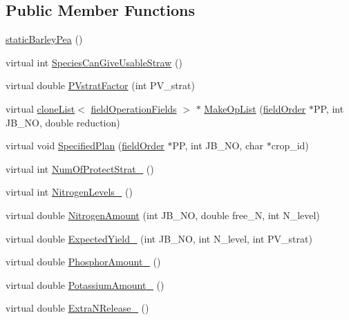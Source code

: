 \subsection*{Public Member Functions}
\begin{DoxyCompactItemize}
\item 
\hyperlink{classstatic_barley_pea_a9930f4c80483ceb0b35eaf9b5e708783}{staticBarleyPea} ()
\item 
virtual int \hyperlink{classstatic_barley_pea_a98daf5a43966b97910b34fea072f5260}{SpeciesCanGiveUsableStraw} ()
\item 
virtual double \hyperlink{classstatic_barley_pea_a34661b51fa85b70f7178d9fc63739139}{PVstratFactor} (int PV\_\-strat)
\item 
virtual \hyperlink{classclone_list}{cloneList}$<$ \hyperlink{classfield_operation_fields}{fieldOperationFields} $>$ $\ast$ \hyperlink{classstatic_barley_pea_a5bdd249b2d75283a8bd007bf338525a6}{MakeOpList} (\hyperlink{classfield_order}{fieldOrder} $\ast$PP, int JB\_\-NO, double reduction)
\item 
virtual void \hyperlink{classstatic_barley_pea_ae0050aa14a078ae8fe7b047cd1f22465}{SpecifiedPlan} (\hyperlink{classfield_order}{fieldOrder} $\ast$PP, int JB\_\-NO, char $\ast$crop\_\-id)
\item 
virtual int \hyperlink{classstatic_barley_pea_ac33dd31e35056a4816bb1bec4613550d}{NumOfProtectStrat\_\-} ()
\item 
virtual int \hyperlink{classstatic_barley_pea_a1e2e6e28ebc8e1a001aa2dfd7de96204}{NitrogenLevels\_\-} ()
\item 
virtual double \hyperlink{classstatic_barley_pea_a8b1a6d68f92bbd24b79e8a3aaafc9cb1}{NitrogenAmount} (int JB\_\-NO, double free\_\-N, int N\_\-level)
\item 
virtual double \hyperlink{classstatic_barley_pea_a49038b3b4434096d4cf1e64c241ac214}{ExpectedYield\_\-} (int JB\_\-NO, int N\_\-level, int PV\_\-strat)
\item 
virtual double \hyperlink{classstatic_barley_pea_a67ba0f94cf104e0a3d547f776399062f}{PhosphorAmount\_\-} ()
\item 
virtual double \hyperlink{classstatic_barley_pea_a0d36ad23dbbf416950d11a5c933bc029}{PotassiumAmount\_\-} ()
\item 
virtual double \hyperlink{classstatic_barley_pea_a8c7afa184fb792692e23bfa854214c9b}{ExtraNRelease\_\-} ()
\end{DoxyCompactItemize}
